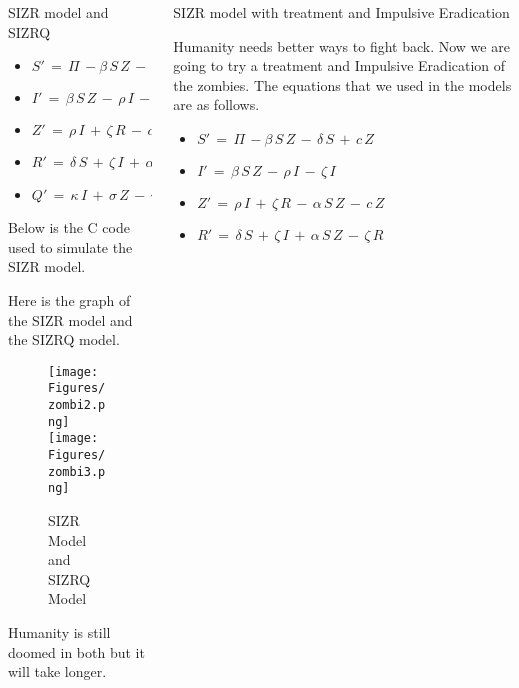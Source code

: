 \documentclass[final]{beamer}
\newlength{\onecolwid}
\newlength{\twocolwid}
\begin{document}
\begin{frame}[t]
\begin{columns}[t]
\begin{column}{\twocolwid}
\begin{columns}[t,totalwidth=\twocolwid]
\begin{column}{\onecolwid}
\begin{block}{SIZR model and SIZRQ}
\begin{small}
\begin{itemize}
\item $S'\,=\,\Pi\,-\beta\,S\,Z\,-\,\delta\,S$ 
\item $I'\,=\,\beta\,S\,Z\,-\,\rho\,I\,-\,\zeta\,I\,-\,\kappa\,I$
\item $Z'\,=\,\rho\,I\,+\,\zeta\,R\,-\,\alpha\,S\,Z\,-\,\sigma\,Z$
\item $R'\,=\,\delta\,S\,+\,\zeta\,I\,+\,\alpha\,S\,Z\,-\,\zeta\,R\,+\,\gamma\,Q$
\item $Q'\,=\,\kappa\,I\,+\,\sigma\,Z\,-\,\gamma\,Q$
\end{itemize}
\end{small}

Below is the C code used to simulate the SIZR model.

\begin{tcolorbox}[breakable, title=\textbf{SIZR.c}]

\end{tcolorbox}

Here is the graph of the SIZR model and the SIZRQ model.

\begin{figure}
\texttt{[image: Figures/zombi2.png]}
\texttt{[image: Figures/zombi3.png]}
\caption{ SIZR Model and SIZRQ Model }
\end{figure}

Humanity is still doomed in both but it will take longer.

\end{block}
\end{column} 

\begin{column}{\onecolwid}\vspace{-.6in} 
\begin{block}{ SIZR model with treatment and Impulsive Eradication }

Humanity needs better ways to fight back. Now we are going to try a treatment
and Impulsive Eradication of the zombies.
The equations that we used in the models are as follows.

\begin{small}
\begin{itemize}
\item $S'\,=\,\Pi\,-\beta\,S\,Z\,-\,\delta\,S\,+\,c\,Z$ 
\item $I'\,=\,\beta\,S\,Z\,-\,\rho\,I\,-\,\zeta\,I$
\item $Z'\,=\,\rho\,I\,+\,\zeta\,R\,-\,\alpha\,S\,Z\,-\,c\,Z$
\item $R'\,=\,\delta\,S\,+\,\zeta\,I\,+\,\alpha\,S\,Z\,-\,\zeta\,R$
\end{itemize}
\end{small}


\end{block}
\end{column}
\end{columns}
\end{column}
\end{columns}
\end{frame}
\end{document}
